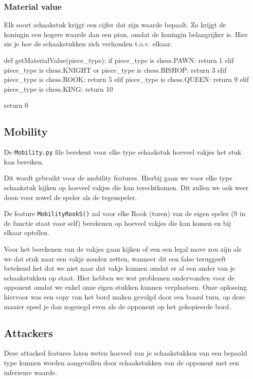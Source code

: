 \documentclass[a4paper,openany]{uantwerpenassignment}
\newcommand{\codeword}[1]{
    \colorbox{code}{\texttt{\textcolor{codetext}{#1}}}
}
\begin{document}
\subsubsection{Material value}
Elk soort schaakstuk krijgt een cijfer dat zijn waarde bepaalt. Zo krijgt de koningin een hogere waarde dan een pion, omdat de koningin belangrijker is. Hier zie je hoe de schaakstukken zich verhouden t.o.v. elkaar. \\[2\baselineskip]

\begin{python}
def getMaterialValue(piece_type):
    if piece_type is chess.PAWN:
        return 1
    elif piece_type is chess.KNIGHT or piece_type is chess.BISHOP:
        return 3
    elif piece_type is chess.ROOK:
        return 5
    elif piece_type is chess.QUEEN:
        return 9
    elif piece_type is chess.KING:
        return 10

    return 0
\end{python}


\subsection{Mobility}
De \codeword{Mobility.py} file berekent voor elke type schaakstuk hoeveel vakjes het stuk kan bereiken. 

Dit wordt gebruikt voor de mobility features. Hierbij gaan we voor elke type schaakstuk kijken op hoeveel vakjes die kan terechtkomen. Dit zullen we ook weer doen voor zowel de speler als de tegenspeler.

De feature \codeword{MobilityRookS()} zal voor elke Rook (toren) van de eigen speler (S in de functie staat voor self) berekenen op hoeveel vakjes die kan komen en bij elkaar optellen.

Voor het berekenen van de vakjes gaan kijken of een een legal move zou zijn als we dat stuk naar een vakje zouden zetten, wanneer dit een false teruggeeft betekend het dat we niet naar dat vakje kunnen omdat er al een ander van je schaakstukken op staat. Hier hebben we wat problemen ondervonden voor de opponent omdat we enkel onze eigen stukken kunnen verplaatsen. Onze oplossing hiervoor was een copy van het bord maken gevolgd door een board turn, op deze manier speel je dan zogezegd even als de opponent op het gekopieerde bord. 
\pagebreak

\subsection{Attackers}
Deze attacked features laten weten hoeveel van je schaakstukken van een bepaald type kunnen worden aangevallen door schaakstukken van de opponent met een inferieure waarde. 
\end{document}
